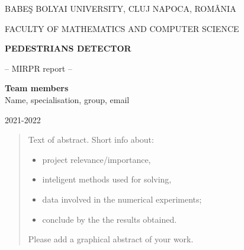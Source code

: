 \documentclass[runningheads,a4paper,11pt]{report}
\begin{document}
\begin{titlepage}
\sloppy

\begin{center}
BABE\c S BOLYAI UNIVERSITY, CLUJ NAPOCA, ROM\^ ANIA

FACULTY OF MATHEMATICS AND COMPUTER SCIENCE

\vspace{6cm}

\Huge \textbf{PEDESTRIANS DETECTOR}

\vspace{1cm}

\normalsize -- MIRPR report --

\end{center}


\vspace{5cm}

\begin{flushright}
\Large{\textbf{Team members}}\\
Name, specialisation, group, email
\end{flushright}

\vspace{4cm}

\begin{center}
2021-2022
\end{center}

\end{titlepage}


\begin{abstract}
	Text of abstract. Short info about: 
	\begin{itemize}
		\item project relevance/importance, 
		\item inteligent methods used for solving, 
		\item data involved in the numerical experiments; 
		\item conclude by the the results obtained.
	\end{itemize}

	Please add a graphical abstract of your work. 
\end{abstract}


\tableofcontents

\newpage

\listoftables
\listoffigures
\listofalgorithms

\newpage

\end{document}
